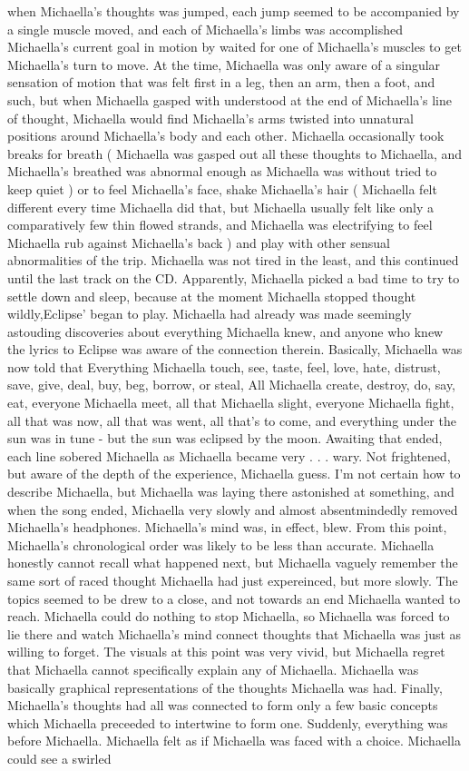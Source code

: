 \documentclass[12pt]{book}
\begin{document}
when Michaella's thoughts was jumped, each jump seemed to be accompanied by a single muscle moved, and each of Michaella's limbs was accomplished Michaella's current goal in motion by waited for one of Michaella's muscles to get Michaella's turn to move. At the time, Michaella was only aware of a singular sensation of motion that was felt first in a leg, then an arm, then a foot, and such, but when Michaella gasped with understood at the end of Michaella's line of thought, Michaella would find Michaella's arms twisted into unnatural positions around Michaella's body and each other. Michaella occasionally took breaks for breath ( Michaella was gasped out all these thoughts to Michaella, and Michaella's breathed was abnormal enough as Michaella was without tried to keep quiet ) or to feel Michaella's face, shake Michaella's hair ( Michaella felt different every time Michaella did that, but Michaella usually felt like only a comparatively few thin flowed strands, and Michaella was electrifying to feel Michaella rub against Michaella's back ) and play with other sensual abnormalities of the trip. Michaella was not tired in the least, and this continued until the last track on the CD. Apparently, Michaella picked a bad time to try to settle down and sleep, because at the moment Michaella stopped thought wildly,Eclipse' began to play. Michaella had already was made seemingly astouding discoveries about everything Michaella knew, and anyone who knew the lyrics to Eclipse was aware of the connection therein. Basically, Michaella was now told that Everything Michaella touch, see, taste, feel, love, hate, distrust, save, give, deal, buy, beg, borrow, or steal, All Michaella create, destroy, do, say, eat, everyone Michaella meet, all that Michaella slight, everyone Michaella fight, all that was now, all that was went, all that's to come, and everything under the sun was in tune - but the sun was eclipsed by the moon. Awaiting that ended, each line sobered Michaella as Michaella became very . . .  wary. Not frightened, but aware of the depth of the experience, Michaella guess. I'm not certain how to describe Michaella, but Michaella was laying there astonished at something, and when the song ended, Michaella very slowly and almost absentmindedly removed Michaella's headphones. Michaella's mind was, in effect, blew. From this point, Michaella's chronological order was likely to be less than accurate. Michaella honestly cannot recall what happened next, but Michaella vaguely remember the same sort of raced thought Michaella had just expereinced, but more slowly. The topics seemed to be drew to a close, and not towards an end Michaella wanted to reach. Michaella could do nothing to stop Michaella, so Michaella was forced to lie there and watch Michaella's mind connect thoughts that Michaella was just as willing to forget. The visuals at this point was very vivid, but Michaella regret that Michaella cannot specifically explain any of Michaella. Michaella was basically graphical representations of the thoughts Michaella was had. Finally, Michaella's thoughts had all was connected to form only a few basic concepts which Michaella preceeded to intertwine to form one. Suddenly, everything was before Michaella. Michaella felt as if Michaella was faced with a choice. Michaella could see a swirled 
\end{document}
